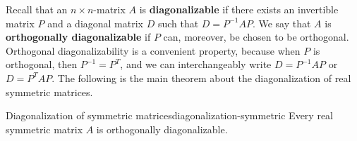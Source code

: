 Recall that an $n\times n$-matrix $A$ is \textbf{diagonalizable}%
%
 if there exists an invertible matrix $P$
and a diagonal matrix $D$ such that $D = P^{-1}AP$. We say that $A$ is
\textbf{orthogonally diagonalizable}%
%
%
%
%
 if $P$ can, moreover, be
chosen to be orthogonal. Orthogonal diagonalizability is a convenient
property, because when $P$ is orthogonal, then $P^{-1}=P^T$, and we
can interchangeably write $D = P^{-1}AP$ or $D = P^TAP$.  The
following is the main theorem about the diagonalization of real
symmetric matrices.

\begin{theorem}{Diagonalization of symmetric matrices}{diagonalization-symmetric}
  Every real symmetric matrix $A$ is orthogonally diagonalizable.
\end{theorem}

